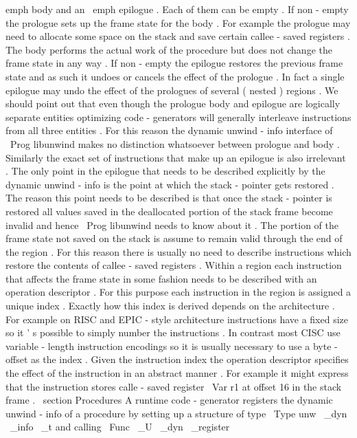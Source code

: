 emph
{
body
}
and
an
\
emph
{
epilogue
}
.
Each
of
them
can
be
empty
.
If
non
-
empty
the
prologue
sets
up
the
frame
state
for
the
body
.
For
example
the
prologue
may
need
to
allocate
some
space
on
the
stack
and
save
certain
callee
-
saved
registers
.
The
body
performs
the
actual
work
of
the
procedure
but
does
not
change
the
frame
state
in
any
way
.
If
non
-
empty
the
epilogue
restores
the
previous
frame
state
and
as
such
it
undoes
or
cancels
the
effect
of
the
prologue
.
In
fact
a
single
epilogue
may
undo
the
effect
of
the
prologues
of
several
(
nested
)
regions
.
We
should
point
out
that
even
though
the
prologue
body
and
epilogue
are
logically
separate
entities
optimizing
code
-
generators
will
generally
interleave
instructions
from
all
three
entities
.
For
this
reason
the
dynamic
unwind
-
info
interface
of
\
Prog
{
libunwind
}
makes
no
distinction
whatsoever
between
prologue
and
body
.
Similarly
the
exact
set
of
instructions
that
make
up
an
epilogue
is
also
irrelevant
.
The
only
point
in
the
epilogue
that
needs
to
be
described
explicitly
by
the
dynamic
unwind
-
info
is
the
point
at
which
the
stack
-
pointer
gets
restored
.
The
reason
this
point
needs
to
be
described
is
that
once
the
stack
-
pointer
is
restored
all
values
saved
in
the
deallocated
portion
of
the
stack
frame
become
invalid
and
hence
\
Prog
{
libunwind
}
needs
to
know
about
it
.
The
portion
of
the
frame
state
not
saved
on
the
stack
is
assume
to
remain
valid
through
the
end
of
the
region
.
For
this
reason
there
is
usually
no
need
to
describe
instructions
which
restore
the
contents
of
callee
-
saved
registers
.
Within
a
region
each
instruction
that
affects
the
frame
state
in
some
fashion
needs
to
be
described
with
an
operation
descriptor
.
For
this
purpose
each
instruction
in
the
region
is
assigned
a
unique
index
.
Exactly
how
this
index
is
derived
depends
on
the
architecture
.
For
example
on
RISC
and
EPIC
-
style
architecture
instructions
have
a
fixed
size
so
it
'
s
possible
to
simply
number
the
instructions
.
In
contrast
most
CISC
use
variable
-
length
instruction
encodings
so
it
is
usually
necessary
to
use
a
byte
-
offset
as
the
index
.
Given
the
instruction
index
the
operation
descriptor
specifies
the
effect
of
the
instruction
in
an
abstract
manner
.
For
example
it
might
express
that
the
instruction
stores
calle
-
saved
register
\
Var
{
r1
}
at
offset
16
in
the
stack
frame
.
\
section
{
Procedures
}
A
runtime
code
-
generator
registers
the
dynamic
unwind
-
info
of
a
procedure
by
setting
up
a
structure
of
type
\
Type
{
unw
\
_dyn
\
_info
\
_t
}
and
calling
\
Func
{
\
_U
\
_dyn
\
_register
}
